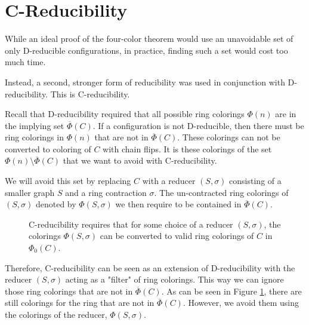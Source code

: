 \section{C-Reducibility}
\label{sec:creduce}

While an ideal proof of the four-color theorem would use an unavoidable set of only D-reducible configurations, in practice, finding such a set would cost too much time.

Instead, a second, stronger form of reducibility was used in conjunction with D-reducibility. This is C-reducibility.

Recall that D-reducibility required that all possible ring colorings $\Phi(n)$ are in the implying set $\overline{\Phi}(C)$. If a configuration is not D-reducible, then there must be ring colorings in $\Phi(n)$ that are not in $\overline{\Phi}(C)$. These colorings can not be converted to coloring of $C$ with chain flips. It is these colorings of the set $\Phi(n) \setminus \overline{\Phi}(C)$ that we want to avoid with C-reducibility. 

We will avoid this set by replacing $C$ with a reducer $(S,\sigma)$ consisting of a smaller graph $S$ and a ring contraction $\sigma$. The un-contracted ring colorings of $(S,\sigma)$ denoted by $\Phi(S, \sigma)$ we then require to be contained in $\overline{\Phi}(C)$.

\begin{figure}[!h]
    \centering

    \caption{C-reducibility requires that for some choice of a reducer $(S,\sigma)$, the colorings $\Phi(S, \sigma)$ can be converted to valid ring colorings of $C$ in $\Phi_0(C)$.}
    \label{fig:cred}
\end{figure}

Therefore, C-reducibility can be seen as an extension of D-reducibility with the reducer $(S, \sigma)$ acting as a "filter" of ring colorings. This way we can ignore those ring colorings that are not in $\overline{\Phi}(C)$. As can be seen in Figure \ref{fig:cred}, there are still colorings for the ring that are not in $\overline{\Phi}(C)$. However, we avoid them using the colorings of the reducer, $\Phi(S, \sigma)$.


